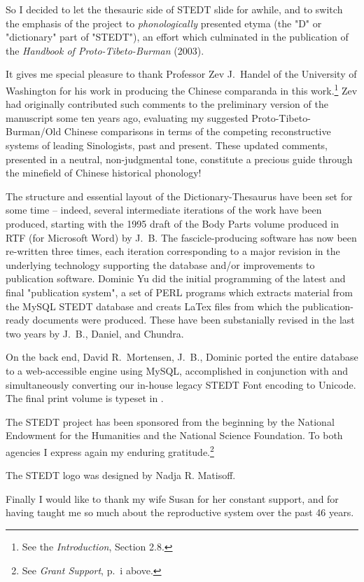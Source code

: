 So I decided to let the thesauric side of STEDT slide for awhile, and to switch the emphasis of the project to \textit{phonologically} presented etyma (the "D" or "dictionary" part of "STEDT"), an effort which culminated in the publication of the \textit{Handbook of Proto-Tibeto-Burman} (2003).

It gives me special pleasure to thank Professor Zev J.\ Handel of the University of Washington for his work in producing the Chinese comparanda in this work.\footnote{See the \textit{Introduction}, Section 2.8.}   Zev had originally contributed such comments to the preliminary version of the manuscript some ten years ago, evaluating my suggested Proto-Tibeto-Burman/Old Chinese comparisons in terms of the competing reconstructive systems of leading Sinologists, past and present.  These updated comments, presented in a neutral, non-judgmental tone, constitute a precious guide through the minefield of Chinese historical phonology!

The structure and essential layout of the Dictionary-Thesaurus have been set for some time -- indeed, several intermediate iterations of the work have been produced, starting with the 1995 draft of the Body Parts volume produced in RTF (for Microsoft Word) by J.~B.  The fascicle-producing software has now been re-written three times, each iteration corresponding to a major revision in the underlying technology supporting the database and/or improvements to publication software. \mbox{Dominic} Yu did the initial programming of the latest and final "publication system", a set of PERL programs which extracts material from the MySQL STEDT database and creats LaTex files from which the publication-ready documents were produced.  These have been substanially revised in the last two years by J.~B., Daniel, and Chundra.  

On the back end, David R.\ Mortensen,  J.~B., Dominic ported the entire database to a web-accessible engine using MySQL, accomplished in conjunction with and simultaneously converting our in-house legacy STEDT Font encoding to Unicode. The final print volume is typeset in \XeLaTeX.

The STEDT project has been sponsored from the beginning by the National Endowment for the Humanities and the National Science Foundation.  To both agencies I express again my enduring gratitude.\footnote{See \textit{Grant Support}, p.~i above.}

The STEDT logo was designed by Nadja R. Matisoff.

Finally I would like to thank my wife Susan for her constant support, and for having taught me so much about the reproductive system over the past 46 years.


